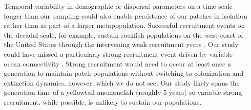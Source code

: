 \documentclass[12pt, oneside]{article}   	%
\begin{document}

Temporal variability in demographic or dispersal parameters on a time scale longer than our sampling could also enable persistence of our patches in isolation \citep[similar to the storage effect,][]{warner1985coexistence} rather than as part of a larger metapopulation. Successful recruitment events on the decadal scale, for example, sustain rockfish populations on the west coast of the United States through the intervening weak recruitment years \citep[e.g.][]{tolimieri2005roles}. Our study could have missed a particularly strong recruitment event driven by variable ocean connectivity \citep[simulations suggest that 20 years are necessary to capture the full extent of ocean variability in the Coral Triangle region surrounding our patches;][]{thompson2018variability}. Strong recruitment would need to occur at least once a generation to maintain patch populations without switching to colonization and extinction dynamics, however, which we do not see. Our study likely spans the generation time of a yellowtail anemonefish (roughly 5 years) so variable strong recruitment, while possible, is unlikely to sustain our populations.
\end{document}
